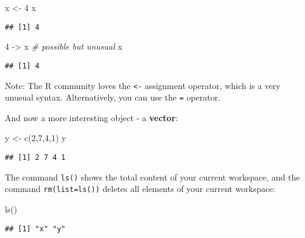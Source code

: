\documentclass[
]{book}
\newenvironment{Shaded}{\begin{snugshade}}{\end{snugshade}}
\newcommand{\CommentTok}[1]{\textcolor[rgb]{0.56,0.35,0.01}{\textit{#1}}}
\newcommand{\DecValTok}[1]{\textcolor[rgb]{0.00,0.00,0.81}{#1}}
\newcommand{\FunctionTok}[1]{\textcolor[rgb]{0.00,0.00,0.00}{#1}}
\newcommand{\NormalTok}[1]{#1}
\newcommand{\OtherTok}[1]{\textcolor[rgb]{0.56,0.35,0.01}{#1}}
\begin{document}
\begin{Shaded}
\begin{Highlighting}[]
\NormalTok{x }\OtherTok{\textless{}{-}} \DecValTok{4} 
\NormalTok{x}
\end{Highlighting}
\end{Shaded}

\begin{verbatim}
## [1] 4
\end{verbatim}

\begin{Shaded}
\begin{Highlighting}[]
\DecValTok{4} \OtherTok{{-}\textgreater{}}\NormalTok{ x }\CommentTok{\# possible but unusual}
\NormalTok{x}
\end{Highlighting}
\end{Shaded}

\begin{verbatim}
## [1] 4
\end{verbatim}

Note: The R community loves the \texttt{\textless{}-} assignment operator, which is a very unusual syntax. Alternatively, you can use the \texttt{=} operator.

And now a more interesting object - a \textbf{vector}:

\begin{Shaded}
\begin{Highlighting}[]
\NormalTok{y }\OtherTok{\textless{}{-}} \FunctionTok{c}\NormalTok{(}\DecValTok{2}\NormalTok{,}\DecValTok{7}\NormalTok{,}\DecValTok{4}\NormalTok{,}\DecValTok{1}\NormalTok{)}
\NormalTok{y}
\end{Highlighting}
\end{Shaded}

\begin{verbatim}
## [1] 2 7 4 1
\end{verbatim}

The command \texttt{ls()} shows the total content of your current workspace, and the command \texttt{rm(list=ls())} deletes all elements of your current workspace:

\begin{Shaded}
\begin{Highlighting}[]
\FunctionTok{ls}\NormalTok{()}
\end{Highlighting}
\end{Shaded}

\begin{verbatim}
## [1] "x" "y"
\end{verbatim}
\end{document}
